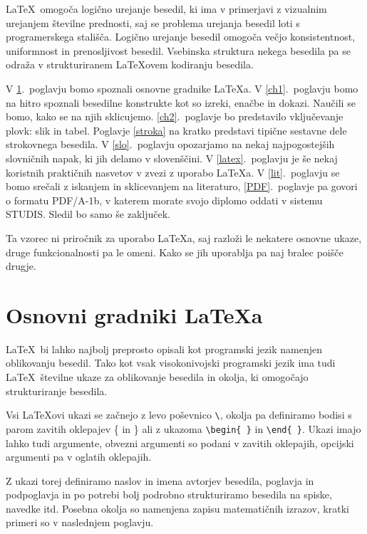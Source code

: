 \documentclass[a4paper,12pt,openright]{book}
\begin{document}
\LaTeX\ omogoča logično urejanje besedil, ki ima v primerjavi z vizualnim urejanjem številne prednosti, saj se problema urejanja besedil loti s programerskega stališča.
Logično urejanje besedil omogoča večjo konsistentnost, uniformnost in  prenosljivost besedil. 
Vsebinska struktura nekega besedila pa se odraža v strukturiranem \LaTeX ovem kodiranju besedila.

V \ref{ch0}.~poglavju bomo spoznali osnovne gradnike \LaTeX{a}.
V \ref{ch1}.~poglavju bomo na hitro spoznali besedilne konstrukte kot so izreki, enačbe in dokazi. 
Naučili se bomo, kako se na njih sklicujemo. 
\ref{ch2}.~poglavje bo predstavilo vključevanje plovk: slik in tabel. 
Poglavje \ref{stroka} na kratko predstavi tipične sestavne dele strokovnega besedila.
V \ref{slo}.~poglavju opozarjamo na nekaj najpogostejših slovničnih napak, ki jih delamo v slovenščini.
V \ref{latex}.~poglavju je še nekaj koristnih praktičnih nasvetov v zvezi z uporabo \LaTeX{a}.
V \ref{lit}.~poglavju se bomo srečali z iskanjem in sklicevanjem na literaturo,
\ref{PDF}.~poglavje pa govori o formatu PDF/A-1b, v katerem morate svojo diplomo oddati v sistemu STUDIS.
Sledil bo samo še zaključek.

Ta vzorec ni priročnik za uporabo \LaTeX{a}, saj razloži le nekatere osnovne ukaze, druge funkcionalnosti pa le omeni. Kako se jih uporablja
pa naj bralec poišče drugje.


\chapter{Osnovni gradniki \LaTeX{a}}
\label{ch0}

\LaTeX\ bi lahko najbolj preprosto opisali kot programski jezik namenjen oblikovanju besedil.
Tako kot vsak visokonivojski programski jezik ima tudi \LaTeX\  številne ukaze za oblikovanje  besedila in okolja, ki omogočajo strukturiranje besedila.

Vsi \LaTeX ovi ukazi se začnejo z levo poševnico  \verb=\=, okolja pa definiramo bodisi s parom zavitih oklepajev \{ in \} ali z ukazoma \verb=\begin{ }= in   \verb=\end{ }=.
Ukazi imajo lahko tudi argumente, obvezni argumenti so podani v zavitih oklepajih, opcijski argumenti pa v oglatih oklepajih.

Z ukazi torej definiramo naslov in imena avtorjev besedila, poglavja in podpoglavja in po potrebi bolj podrobno strukturiramo besedila na spiske, navedke itd.
Posebna okolja so namenjena zapisu matematičnih izrazov, kratki primeri so v naslednjem poglavju.
\end{document}
